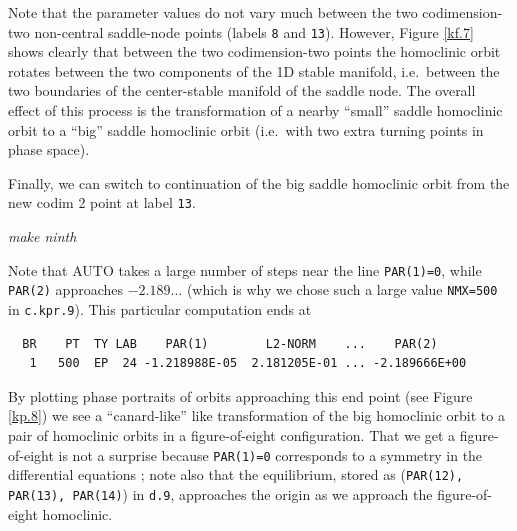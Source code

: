 \documentclass[12pt]{report}
\begin{document}
Note that the parameter values do not vary much between the
two codimension-two non-central saddle-node points (labels {\tt 8} and {\tt 13}).
However, Figure \ref{kf.7} shows clearly that between the two
codimension-two points 
the homoclinic orbit
rotates between the two components of the 1D stable manifold, i.e.\
between the two boundaries of the center-stable manifold of the saddle
node. The overall effect of this process is the transformation of a
nearby ``small'' saddle homoclinic orbit to a ``big'' saddle
homoclinic orbit (i.e.\ with two extra turning points in phase space).  

Finally, we can switch to continuation of the big saddle homoclinic orbit 
from the new codim 2 point at label {\tt 13}. 
\begin{center}
{\it make ninth}
\end{center}
Note that {\cal AUTO} takes a large number of steps near the line  
{\tt PAR(1)=0}, while {\tt PAR(2)} approaches $-2.189\ldots$  
(which is why we chose such a large value {\tt NMX=500} in {\tt c.kpr.9}). This
particular computation ends at 
\begin{verbatim}  
  BR    PT  TY LAB    PAR(1)        L2-NORM    ...    PAR(2)   
   1   500  EP  24 -1.218988E-05  2.181205E-01 ... -2.189666E+00
\end{verbatim}
By plotting phase portraits of orbits approaching this end point (see Figure
\ref{kp.8}) we see a ``canard-like'' like transformation of the big homoclinic
orbit to a pair of homoclinic orbits in a figure-of-eight configuration.
That we get a figure-of-eight is not a surprise because {\tt PAR(1)=0}
corresponds to a symmetry in the differential equations \cite{Ko:94};
note also that the equilibrium, stored as ({\tt PAR(12), PAR(13), PAR(14)}) in
{\tt d.9}, approaches the origin as we approach the figure-of-eight homoclinic.
\end{document}
